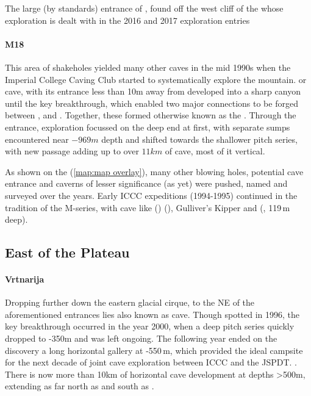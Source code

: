 \begin{marginfigure}
\checkoddpage \ifoddpage \forcerectofloat \else \forceversofloat \fi
\centering
 \caption{The large (by \protect{} standards) entrance of \protect{}, found off the west cliff of the \protect{} whose exploration is dealt with in the 2016 and 2017 exploration entries }
 \label{surfaceprima}
\end{marginfigure}

\paragraph{M18} This area of shakeholes yielded many other caves in the mid 1990s when the Imperial College Caving Club started to systematically explore the mountain.  or  cave, with its entrance less than 10m away from  developed into a sharp canyon until the key  breakthrough, which enabled two major connections to be forged between ,  and . Together, these formed  otherwise known as the . Through the  entrance, exploration focussed on the deep end at first, with separate sumps encountered near $-969m$ depth and shifted towards the shallower pitch series, with new passage adding up to over $11km$ of cave, most of it vertical.

As shown on the  (\vref{map:map overlay}), many other blowing holes, potential cave entrance and caverns of lesser significance (as yet) were pushed, named and surveyed over the years. Early ICCC expeditions (1994-1995) continued in the tradition of the M-series, with cave like  ()  (), Gulliver's Kipper and  (, 119\,m deep). 

\subsection{East of the Plateau} 

\paragraph{Vrtnarija}
Dropping further down the eastern glacial cirque, to the NE of the aforementioned entrances lies  also known as   cave. Though spotted in 1996, the key breakthrough occurred in the year 2000, when a deep pitch series quickly dropped to -350m and was left ongoing. The following year ended on the discovery a long horizontal gallery at -550\,m, which provided the ideal campsite for the next decade of joint cave exploration between ICCC and the JSPDT. . There is now more than 10km of horizontal cave development at depths >500m, extending as far north as  and south as . 

